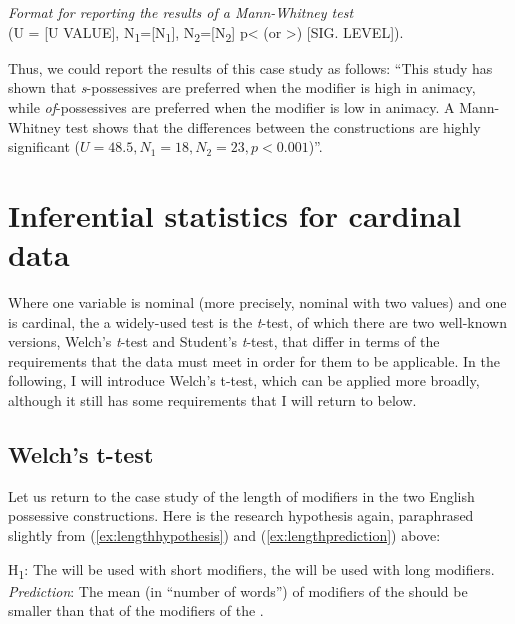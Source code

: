 \begin{exe}
\ex \textit{Format for reporting the results of a Mann-Whitney test} \\
(U = [U VALUE], N\textsubscript{1}=[N\textsubscript{1}], N\textsubscript{2}=[N\textsubscript{2}] p< (or >) [SIG. LEVEL]).
\label{ex:reportingmannwhitney}
\end{exe}

Thus, we could report the results of this case study as follows: ``This study has shown that \textit{s}-possessives are preferred when the modifier is high in animacy, while \textit{of}-possessives are preferred when the modifier is low in animacy. A Mann-Whitney test shows that the differences between the constructions are highly significant ($U = 48.5, N_1 =  18, N_2 = 23, p < 0.001$)''.

\section{Inferential statistics for cardinal data}
\label{sec:statisticscardinal}

Where one variable is nominal (more precisely, nominal with two values) and one is cardinal, the a widely-used test is the \textit{t}-test, of which there are two well-known versions, Welch's \textit{t}-test and Student's \textit{t}-test, that differ in terms of the requirements that the data must meet in order for them to be applicable. In the following, I will introduce Welch's t-test, which can be applied more broadly, although it still has some requirements that I will return to below.

\subsection{Welch's t-test}
\label{sec:welchsttest}


Let us return to the case study of the length of modifiers in the two English possessive constructions. Here is the research hypothesis again, paraphrased slightly from (\ref{ex:lengthhypothesis}) and (\ref{ex:lengthprediction}) above:

\begin{exe}
\ex H\textsubscript{1}: The  will be used with short modifiers, the  will be used with long modifiers. \\
\textit{Prediction}: The mean  (in ``number of words'') of modifiers of the  should be smaller than that of the modifiers of the .
\label{ex:lengthalternative}
\end{exe}

